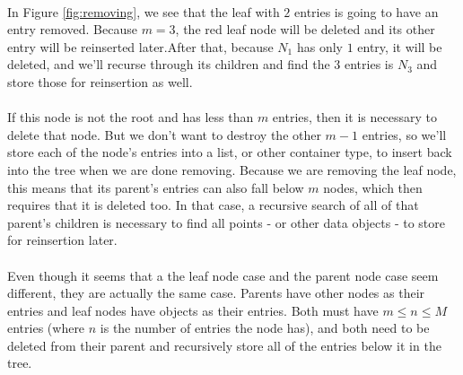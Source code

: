 \documentclass{article}
\begin{document}
\paragraph{}
In Figure \ref{fig:removing}, we see that the leaf with $2$ entries is going to have an entry removed. Because $m=3$, the red leaf node will be deleted and its other entry will be reinserted later.After that, because $N_1$ has only $1$ entry, it will be deleted, and we'll recurse through its children and find the $3$ entries is $N_3$ and store those for reinsertion as well.
\paragraph{}
If this node is not the root and has less than $m$ entries, then it is necessary to delete that node. But we don't want to destroy
the other $m - 1$ entries, so we'll store each of the node's entries into a list, or other container type, to insert back into
the tree when we are done removing. Because we are removing the leaf node, this means that its parent's entries can also fall below
$m$ nodes, which then requires that it is deleted too. In that case, a recursive search of all of that parent's children is necessary
to find all points - or other data objects - to store for reinsertion later.
\paragraph{}
Even though it seems that a the leaf node case and the parent node case seem different, they are actually the same case. Parents have
other nodes as their entries and leaf nodes have objects as their entries. Both must have $m \le n \le M$ entries (where $n$ is the number
of entries the node has), and both need to be deleted from their parent and recursively store all of the entries below it in the tree.



\end{document}
